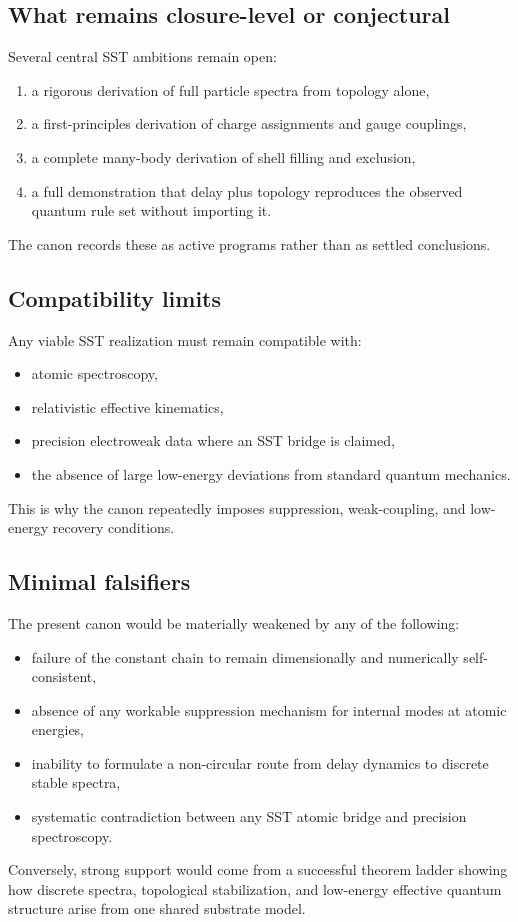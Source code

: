 \documentclass[11pt]{article}
\theoremstyle{definition}
\theoremstyle{plain}
\theoremstyle{remark}
\begin{document}
    \subsection{What remains closure-level or conjectural}
        Several central SST ambitions remain open:
        \begin{enumerate}
            \item a rigorous derivation of full particle spectra from topology alone,
            \item a first-principles derivation of charge assignments and gauge couplings,
            \item a complete many-body derivation of shell filling and exclusion,
            \item a full demonstration that delay plus topology reproduces the observed quantum rule set without importing it.
        \end{enumerate}
        The canon records these as active programs rather than as settled conclusions.

    \subsection{Compatibility limits}
        Any viable SST realization must remain compatible with:
        \begin{itemize}
            \item atomic spectroscopy,
            \item relativistic effective kinematics,
            \item precision electroweak data where an SST bridge is claimed,
            \item the absence of large low-energy deviations from standard quantum mechanics.
        \end{itemize}
        This is why the canon repeatedly imposes suppression, weak-coupling, and low-energy recovery conditions.

    \subsection{Minimal falsifiers}
        The present canon would be materially weakened by any of the following:
        \begin{itemize}
            \item failure of the constant chain to remain dimensionally and numerically self-consistent,
            \item absence of any workable suppression mechanism for internal modes at atomic energies,
            \item inability to formulate a non-circular route from delay dynamics to discrete stable spectra,
            \item systematic contradiction between any SST atomic bridge and precision spectroscopy.
        \end{itemize}
        Conversely, strong support would come from a successful theorem ladder showing how discrete spectra, topological stabilization, and low-energy effective quantum structure arise from one shared substrate model.
\end{document}
